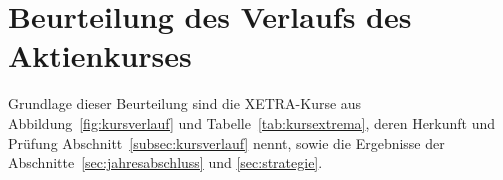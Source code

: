\section{Beurteilung des Verlaufs des Aktienkurses}
\label{sec:aktienkurs}

Grundlage dieser Beurteilung sind die XETRA-Kurse aus
Abbildung~\ref{fig:kursverlauf} und Tabelle~\ref{tab:kursextrema}, deren
Herkunft und Pr\"ufung Abschnitt~\ref{subsec:kursverlauf} nennt, sowie die
Ergebnisse der Abschnitte~\ref{sec:jahresabschluss} und \ref{sec:strategie}.

